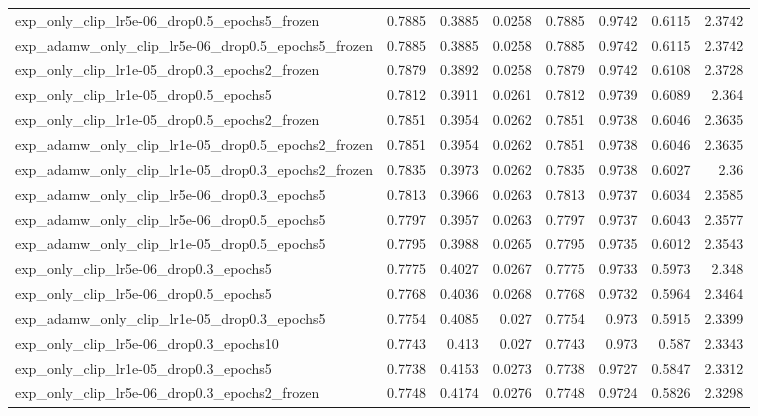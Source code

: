 \documentclass[a4paper,oneside,bibliography=totoc]{scrbook}
\begin{document}
\begin{landscape}
\begin{center}
\begin{longtable}{p{4cm} *{7}{r}}
        exp\_only\_clip\_lr5e-06\_drop0.5\_epochs5\_frozen & 0.7885 & 0.3885 & 0.0258 & 0.7885 & 0.9742 & 0.6115 & 2.3742 \\ 
        exp\_adamw\_only\_clip\_lr5e-06\_drop0.5\_epochs5\_frozen & 0.7885 & 0.3885 & 0.0258 & 0.7885 & 0.9742 & 0.6115 & 2.3742 \\ 
        exp\_only\_clip\_lr1e-05\_drop0.3\_epochs2\_frozen & 0.7879 & 0.3892 & 0.0258 & 0.7879 & 0.9742 & 0.6108 & 2.3728 \\ 
        exp\_only\_clip\_lr1e-05\_drop0.5\_epochs5 & 0.7812 & 0.3911 & 0.0261 & 0.7812 & 0.9739 & 0.6089 & 2.364 \\ 
        exp\_only\_clip\_lr1e-05\_drop0.5\_epochs2\_frozen & 0.7851 & 0.3954 & 0.0262 & 0.7851 & 0.9738 & 0.6046 & 2.3635 \\ 
        exp\_adamw\_only\_clip\_lr1e-05\_drop0.5\_epochs2\_frozen & 0.7851 & 0.3954 & 0.0262 & 0.7851 & 0.9738 & 0.6046 & 2.3635 \\ 
        exp\_adamw\_only\_clip\_lr1e-05\_drop0.3\_epochs2\_frozen & 0.7835 & 0.3973 & 0.0262 & 0.7835 & 0.9738 & 0.6027 & 2.36 \\ 
        exp\_adamw\_only\_clip\_lr5e-06\_drop0.3\_epochs5 & 0.7813 & 0.3966 & 0.0263 & 0.7813 & 0.9737 & 0.6034 & 2.3585 \\ 
        exp\_adamw\_only\_clip\_lr5e-06\_drop0.5\_epochs5 & 0.7797 & 0.3957 & 0.0263 & 0.7797 & 0.9737 & 0.6043 & 2.3577 \\ 
        exp\_adamw\_only\_clip\_lr1e-05\_drop0.5\_epochs5 & 0.7795 & 0.3988 & 0.0265 & 0.7795 & 0.9735 & 0.6012 & 2.3543 \\ 
        exp\_only\_clip\_lr5e-06\_drop0.3\_epochs5 & 0.7775 & 0.4027 & 0.0267 & 0.7775 & 0.9733 & 0.5973 & 2.348 \\ 
        exp\_only\_clip\_lr5e-06\_drop0.5\_epochs5 & 0.7768 & 0.4036 & 0.0268 & 0.7768 & 0.9732 & 0.5964 & 2.3464 \\ 
        exp\_adamw\_only\_clip\_lr1e-05\_drop0.3\_epochs5 & 0.7754 & 0.4085 & 0.027 & 0.7754 & 0.973 & 0.5915 & 2.3399 \\ 
        exp\_only\_clip\_lr5e-06\_drop0.3\_epochs10 & 0.7743 & 0.413 & 0.027 & 0.7743 & 0.973 & 0.587 & 2.3343 \\ 
        exp\_only\_clip\_lr1e-05\_drop0.3\_epochs5 & 0.7738 & 0.4153 & 0.0273 & 0.7738 & 0.9727 & 0.5847 & 2.3312 \\ 
        exp\_only\_clip\_lr5e-06\_drop0.3\_epochs2\_frozen & 0.7748 & 0.4174 & 0.0276 & 0.7748 & 0.9724 & 0.5826 & 2.3298 \\ 

\end{longtable}
\end{center}
\end{landscape}
\end{document}
